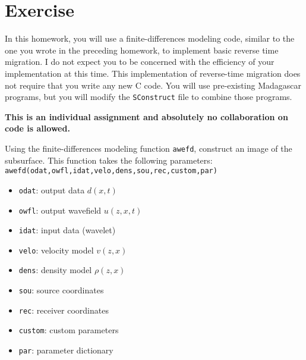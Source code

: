 

\section{Exercise}

In this homework, you will use a finite-differences modeling code,
similar to the one you wrote in the preceding homework, to implement
basic reverse time migration. I do not expect you to be concerned with
the efficiency of your implementation at this time. This
implementation of reverse-time migration does not require that you
write any new C code. You will use pre-existing Madagascar programs,
but you will modify the \texttt{SConstruct} file to combine those
programs.

\textbf{This is an individual assignment and absolutely no
  collaboration on code is allowed.}

Using the finite-differences modeling function \texttt{awefd},
construct an image of the subsurface. This function takes the
following parameters: \\
\texttt{awefd(odat,owfl,idat,velo,dens,sou,rec,custom,par)}
\begin{itemize}
\item \texttt{odat}: output data $d\left( x,t \right)$
\item \texttt{owfl}: output wavefield $u \left( z,x,t \right)$
\item \texttt{idat}: input data (wavelet)
\item \texttt{velo}: velocity model $v \left( z,x \right)$
\item \texttt{dens}: density model $\rho \left( z,x \right)$
\item \texttt{sou}: source coordinates
\item \texttt{rec}: receiver coordinates
\item \texttt{custom}: custom parameters
\item\texttt{par}: parameter dictionary
\end{itemize}

